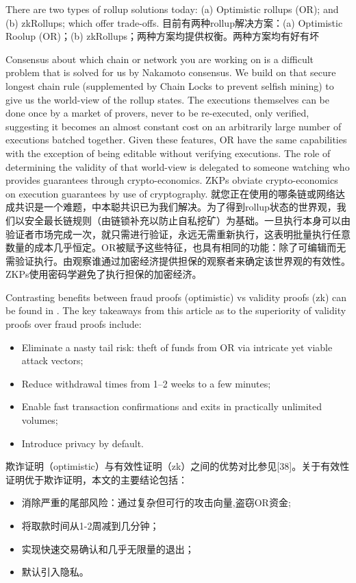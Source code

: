 \documentclass{ctexart}
\begin{document}
There are two types of rollup solutions today: (a) Optimistic rollups (OR); and (b) zkRollups; which offer trade-offs. 目前有两种rollup解决方案：(a) Optimistic Roolup (OR)；(b) zkRollups；两种方案均提供权衡。两种方案均有好有坏

Consensus about which chain or network you are working on is a difficult problem that is solved for us by Nakamoto consensus. We build on that secure longest chain rule (supplemented by Chain Locks to prevent selfish mining) to give us the world-view of the rollup states. The executions themselves can be done once by a market of provers, never to be re-executed, only verified, suggesting it becomes an almost constant cost on an arbitrarily large number of executions batched together. Given these features, OR have the same capabilities with the exception of being editable without verifying executions. The role of determining the validity of that world-view is delegated to someone watching who provides guarantees through crypto-economics. ZKPs obviate crypto-economics on execution guarantees by use of cryptography. 就您正在使用的哪条链或网络达成共识是一个难题，中本聪共识已为我们解决。为了得到rollup状态的世界观，我们以安全最长链规则（由链锁补充以防止自私挖矿）为基础。一旦执行本身可以由验证者市场完成一次，就只需进行验证，永远无需重新执行，这表明批量执行任意数量的成本几乎恒定。OR被赋予这些特征，也具有相同的功能：除了可编辑而无需验证执行。由观察谁通过加密经济提供担保的观察者来确定该世界观的有效性。ZKPs使用密码学避免了执行担保的加密经济。

Contrasting benefits between fraud proofs (optimistic) vs validity proofs (zk) can be found in \cite{Sta19}. The key takeaways from this article as to the superiority of validity proofs over fraud proofs include:

\begin{itemize}
\item Eliminate a nasty tail risk: theft of funds from OR via intricate yet viable attack vectors;
\item Reduce withdrawal times from 1–2 weeks to a few minutes;
\item Enable fast transaction confirmations and exits in practically unlimited volumes;
\item Introduce privacy by default.
\end{itemize}

欺诈证明（optimistic）与有效性证明（zk）之间的优势对比参见[38]。关于有效性证明优于欺诈证明，本文的主要结论包括：

\begin{itemize}
\item 消除严重的尾部风险：通过复杂但可行的攻击向量,盗窃OR资金;
\item 将取款时间从1-2周减到几分钟；
\item 实现快速交易确认和几乎无限量的退出；
\item 默认引入隐私。
\end{itemize}
\end{document}

